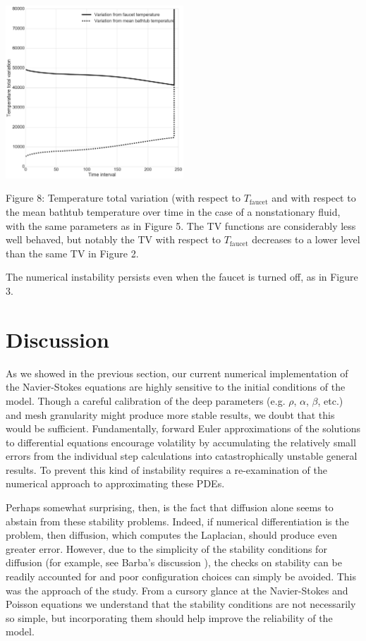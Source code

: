 \documentclass[12pt]{amsart}
\begin{document}
\begin{center}
    \includegraphics[width=0.5\textwidth]{../plots/tv-04.png}

    Figure 8: Temperature total variation (with respect to $T_{\mathrm{faucet}}$
    and with respect to the mean bathtub temperature over time in the case of a
    nonstationary fluid, with the same parameters as in Figure 5. The TV
    functions are considerably less well behaved, but notably the TV with
    respect to $T_{\mathrm{faucet}}$ decreases to a lower level than the same TV
    in Figure 2.
\end{center}


The numerical instability persists even when the faucet is turned off, as in
Figure 3.


\section{Discussion}

As we showed in the previous section, our current numerical implementation of
the Navier-Stokes equations are highly sensitive to the initial conditions of
the model. Though a careful calibration of the deep parameters (e.g. $\rho$,
$\alpha$, $\beta$, etc.) and mesh granularity might produce more stable results,
we doubt that this would be sufficient. Fundamentally, forward Euler
approximations of the solutions to differential equations encourage volatility 
by accumulating the relatively small errors from the individual step
calculations into catastrophically unstable general results. To prevent this
kind of instability requires a re-examination of the numerical approach to
approximating these PDEs.

Perhaps somewhat surprising, then, is the fact that diffusion alone seems to
abstain from these stability problems. Indeed, if numerical differentiation is
the problem, then diffusion, which computes the Laplacian, should produce even
greater error. However, due to the simplicity of the stability conditions for
diffusion (for example, see Barba's discussion \cite{12-steps}), the checks on
stability can be readily accounted for and poor configuration choices can simply
be avoided. This was the approach of the study. From a cursory glance at the
Navier-Stokes and Poisson equations we understand that the stability conditions
are not necessarily so simple, but incorporating them should help improve the
reliability of the model.
\end{document}
